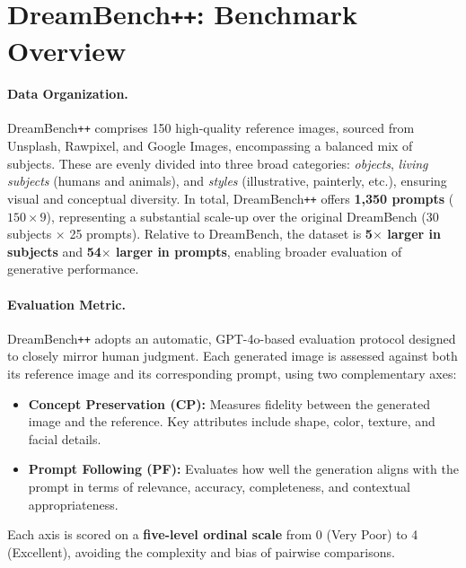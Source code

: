 \appendix

\section{DreamBench\texttt{++}: Benchmark Overview}
\label{app:DreamBench_Plus}

\paragraph{Data Organization.}  
DreamBench\texttt{++} comprises 150 high-quality reference images, sourced from Unsplash, Rawpixel, and Google Images, encompassing a balanced mix of subjects. These are evenly divided into three broad categories: \textit{objects}, \textit{living subjects} (humans and animals), and \textit{styles} (illustrative, painterly, etc.), ensuring visual and conceptual diversity.
In total, DreamBench\texttt{++} offers \textbf{1,350 prompts} ($150 \times 9$), representing a substantial scale-up over the original DreamBench (30 subjects $\times$ 25 prompts). Relative to DreamBench, the dataset is \textbf{5$\times$ larger in subjects} and \textbf{54$\times$ larger in prompts}, enabling broader evaluation of generative performance.

\paragraph{Evaluation Metric.}  
DreamBench\texttt{++} adopts an automatic, GPT-4o-based evaluation protocol designed to closely mirror human judgment. Each generated image is assessed against both its reference image and its corresponding prompt, using two complementary axes:

\begin{itemize}[left=2pt, itemsep=0.5pt,topsep=0.5pt]
  \item \textbf{Concept Preservation (CP):} Measures fidelity between the generated image and the reference. Key attributes include shape, color, texture, and facial details.
  \item \textbf{Prompt Following (PF):} Evaluates how well the generation aligns with the prompt in terms of relevance, accuracy, completeness, and contextual appropriateness.
\end{itemize}

Each axis is scored on a \textbf{five-level ordinal scale} from 0 (Very Poor) to 4 (Excellent), avoiding the complexity and bias of pairwise comparisons.



